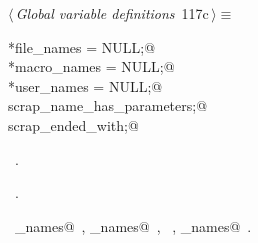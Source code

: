 \documentclass[a4paper]{report}
\begin{document}
\begin{flushleft} \small
\begin{minipage}{\linewidth}\label{scrap252}\raggedright\small
{} $\langle\,${\it Global variable definitions}\nobreak\ {\footnotesize {117c}}$\,\rangle\equiv$
\vspace{-1ex}
\begin{list}{}{} \item
\mbox{}\verb@Name *file_names = NULL;@\\
\mbox{}\verb@Name *macro_names = NULL;@\\
\mbox{}\verb@Name *user_names = NULL;@\\
\mbox{}\verb@int scrap_name_has_parameters;@\\
\mbox{}\verb@int scrap_ended_with;@\\
\mbox{}\verb@@{\NWsep}
\end{list}
\vspace{-1.5ex}
\footnotesize
\begin{list}{}{\setlength{\itemsep}{-\parsep}\setlength{\itemindent}{-\leftmargin}}
\item \NWtxtMacroDefBy\ .
\item \NWtxtMacroRefIn\ .
\item \NWtxtIdentsUsed\nobreak\  \verb@file_names@\nobreak\ , \verb@macro_names@\nobreak\ , \verb@Name@\nobreak\ , \verb@user_names@\nobreak\ .
\item{}
\end{list}
\end{minipage}\vspace{4ex}
\end{flushleft}
\end{document}
